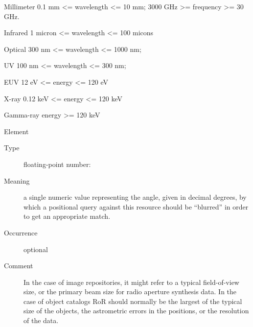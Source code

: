 \documentclass[11pt,a4paper]{ivoa}
\begin{document}
\begin{generated}
\begin{bigdescription}
\begin{description}
\begin{longtermsdescription}
\item[Millimeter]
                 0.1 mm <= wavelength <= 10 mm; 
                 3000 GHz >= frequency >= 30 GHz.
               
\item[Infrared]
                 1 micron <= wavelength <= 100 micons 
               
\item[Optical]
                 300 nm <= wavelength <= 1000 nm; 
               
\item[UV]
                 100 nm <= wavelength <= 300 nm; 
               
\item[EUV]
                 12 eV <= energy <= 120 eV
               
\item[X-ray]
                 0.12 keV <= energy <= 120 keV
               
\item[Gamma-ray]
                 energy >= 120 keV
               
\end{longtermsdescription}

\end{description}
\item[Element \xmlel{regionOfRegard}]
\begin{description}
\item[Type] floating-point number: 
\item[Meaning] 
                  a single numeric value representing the angle, given
                  in decimal degrees, by which a positional query
                  against this resource should be “blurred” in order
                  to get an appropriate match. 
               
\item[Occurrence] optional
\item[Comment] 
                  In the case of image repositories, it might refer to
                  a typical field-of-view size, or the primary beam
                  size for radio aperture synthesis data.  In the case
                  of object catalogs RoR should normally be the
                  largest of the typical size of the objects, the
                  astrometric errors in the positions, or the
                  resolution of the data.  
               

\end{description}


\end{bigdescription}\endgroup

\endgroup
\end{generated}
\end{document}
